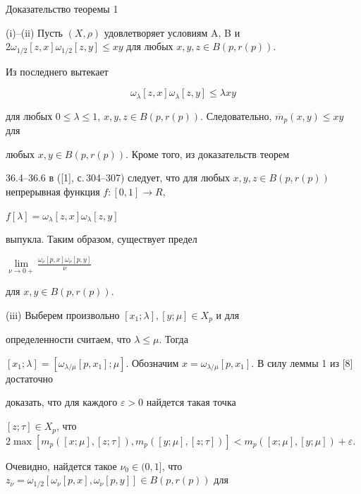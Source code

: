 \begin{pf*}{Доказательство теоремы 1}


(i)--(ii) Пусть $(X,\rho)$ удовлетворяет условиям A, B и\\


$2\omega_{1/2}[z, x]\omega_{1/2}[z, y]


\leq xy$ для любых $x, y, z \in B(p, r(p))$.


Из последнего вытекает


\begin{equation}


\omega_{\lambda}[z,x]\omega_{\lambda}[z,y] \leq \lambda xy


\end{equation}


для любых $0 \leq \lambda \leq 1$, $x, y, z \in


B(p,r(p))$. Следовательно, $\overline{m}_{p}( x, y) \leq xy$ для


любых $x, y \in B(p, r(p))$. Кроме того, из доказательств теорем


36.4--36.6 в ([1], с.\,304--307) следует, что для любых $x, y, z


\in B(p,r(p))$ непрерывная функция $f : [0,1] \rightarrow R$,


$f[\lambda ]=\omega_{\lambda}[z,x]\omega_{\lambda}[z,y]$


выпукла. Таким образом, существует предел


$\lim\limits_{\nu \to 0+}{\frac{\omega_{\nu}[p, x]\omega_{\nu}[p,y]}{\nu}}$


для $x, y \in B(p,r(p))$.





(iii) Выберем произвольно $[x_1;\lambda], [y;\mu] \in X_p$ и для


определенности считаем, что $\lambda \leq \mu$. Тогда


$[x_1;\lambda]=[\omega_{\lambda/\mu}[p,x_1];\mu]$. Обозначим $x


=\omega_{\lambda/\mu}[p,x_1]$. В силу леммы 1 из [8] достаточно


доказать, что для каждого $\varepsilon >0$ найдется такая точка


$[z;\tau ] \in X_p$, что $2\max[m_p([x;\mu],[z;\tau


]),m_p([y;\mu],[z;\tau ])]<m_p([x;\mu],[y;\mu])+\varepsilon$.


Очевидно, найдется такое $\nu_0 \in (0,1]$, что $z_\nu=


\omega_{1/2}[\omega_\nu[p,x],\omega_\nu[p,y]] \in B(p,r(p))$ для



\end{pf*}
